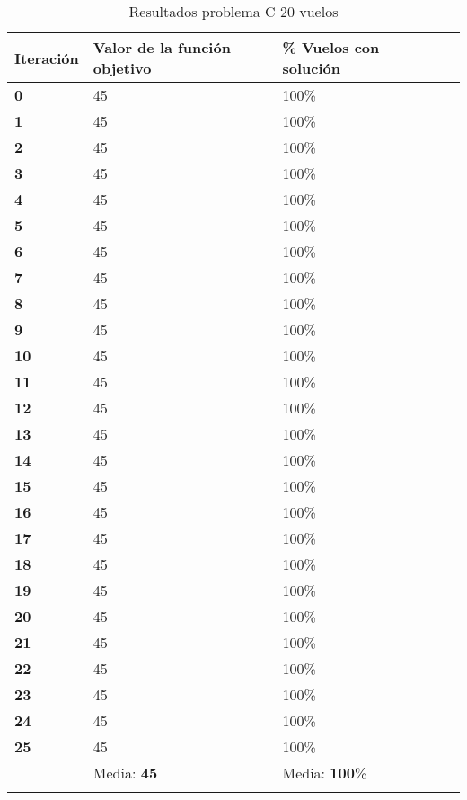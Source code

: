 \begin{longtable}{| p{} | p{} |  p{} | p{}  | p{} | }
	\hline
	\textbf{Iteración} & \textbf{Valor de la función objetivo} &\textbf{\% Vuelos con solución} \\ \hline
	\textbf{0} &45 &100\%  \\ \hline
	\textbf{1} &45 &100\%  \\ \hline
	\textbf{2} &45 &100\%  \\ \hline
	\textbf{3} &45 &100\%  \\ \hline
	\textbf{4} &45 &100\%  \\ \hline
	\textbf{5} &45 &100\%  \\ \hline
	\textbf{6} &45 &100\%  \\ \hline
	\textbf{7} &45 &100\%  \\ \hline
	\textbf{8} &45 &100\%  \\ \hline
	\textbf{9} &45 &100\%  \\ \hline
	\textbf{10} &45 &100\%  \\ \hline
	\textbf{11} &45 &100\%  \\ \hline
	\textbf{12} &45 &100\%  \\ \hline
	\textbf{13} &45 &100\%  \\ \hline
	\textbf{14} &45 &100\%  \\ \hline
	\textbf{15} &45 &100\%  \\ \hline
	\textbf{16} &45 &100\%  \\ \hline
	\textbf{17} &45 &100\%  \\ \hline
	\textbf{18} &45 &100\%  \\ \hline
	\textbf{19} &45 &100\%  \\ \hline
	\textbf{20} &45 &100\%  \\ \hline
	\textbf{21} &45 &100\%  \\ \hline
	\textbf{22} &45 &100\%  \\ \hline
	\textbf{23} &45 &100\%  \\ \hline
	\textbf{24} &45 &100\%  \\ \hline
	\textbf{25} &45 &100\%  \\ \hline
				&Media: \textbf{45}  &Media: \textbf{100}\%  \\ \hline
	\caption{Resultados problema C 20 vuelos } %
	\label{tab: Resultados problema C 20 vuelos}

	
\end{longtable}



